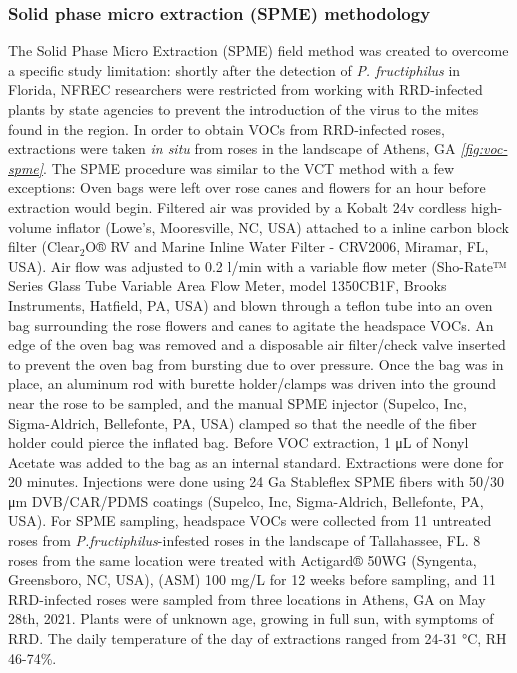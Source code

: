 \documentclass{ufdissertation}[overrideChapters] %
\begin{document}
{\hypertarget{solid-phase-micro-extraction-spme-methodology}{%
\subsubsection{Solid phase micro extraction (SPME) methodology}\label{solid-phase-micro-extraction-spme-methodology}}

The Solid Phase Micro Extraction (SPME) field method was created to overcome a specific study limitation: shortly after the detection of \emph{P. fructiphilus} in Florida, NFREC researchers were restricted from working with RRD-infected plants by state agencies to prevent the introduction of the virus to the mites found in the region. In order to obtain VOCs from RRD-infected roses, extractions were taken \emph{in situ} from roses in the landscape of Athens, GA \emph{\ref{fig:voc-spme}}. The SPME procedure was similar to the VCT method with a few exceptions: Oven bags were left over rose canes and flowers for an hour before extraction would begin. Filtered air was provided by a Kobalt 24v cordless high-volume inflator (Lowe's, Mooresville, NC, USA) attached to a inline carbon block filter (Clear\(_2\)O® RV and Marine Inline Water Filter - CRV2006, Miramar, FL, USA). Air flow was adjusted to 0.2 \si{\litre}/min with a variable flow meter (Sho-Rate™ Series Glass Tube Variable Area Flow Meter, model 1350CB1F, Brooks Instruments, Hatfield, PA, USA) and blown through a teflon tube into an oven bag surrounding the rose flowers and canes to agitate the headspace VOCs. An edge of the oven bag was removed and a disposable air filter/check valve inserted to prevent the oven bag from bursting due to over pressure. Once the bag was in place, an aluminum rod with burette holder/clamps was driven into the ground near the rose to be sampled, and the manual SPME injector (Supelco, Inc, Sigma-Aldrich, Bellefonte, PA, USA) clamped so that the needle of the fiber holder could pierce the inflated bag. Before VOC extraction, 1 \si{\micro\liter} of Nonyl Acetate was added to the bag as an internal standard. Extractions were done for 20 minutes. Injections were done using 24 Ga Stableflex SPME fibers with 50/30 \si{\micro\meter} DVB/CAR/PDMS coatings (Supelco, Inc, Sigma-Aldrich, Bellefonte, PA, USA). For SPME sampling, headspace VOCs were collected from 11 untreated roses from \emph{P.fructiphilus}-infested roses in the landscape of Tallahassee, FL. 8 roses from the same location were treated with Actigard® 50WG (Syngenta, Greensboro, NC, USA), (ASM) 100 \si{\milli\gram}/\si{\liter} for 12 weeks before sampling, and 11 RRD-infected roses were sampled from three locations in Athens, GA on May 28th, 2021. Plants were of unknown age, growing in full sun, with symptoms of RRD. The daily temperature of the day of extractions ranged from 24-31 °C, RH 46-74\%.

}
\end{document}
